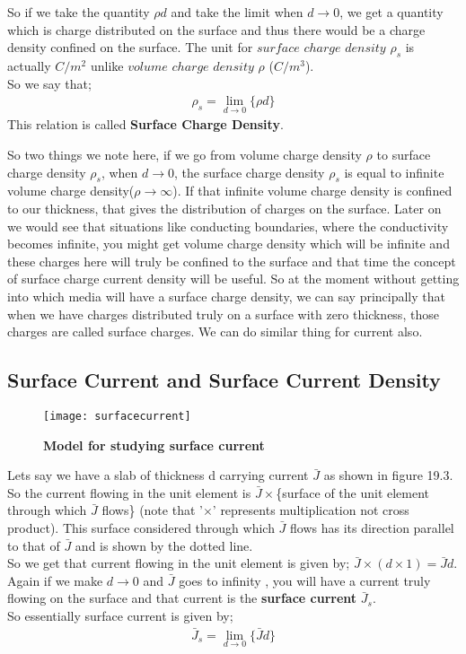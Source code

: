  
 So if we take the quantity $\rho d$ and take the limit when $d\rightarrow0$, we get a quantity which is charge distributed on the surface and thus there would be a charge density confined on the surface. The unit for $surface$ $charge$ $density$ $\rho_{s}$ is actually $C/m^{2}$ unlike $volume$ $charge$ $density$ $\rho$ ($C/m^{3}$).\\
 So we say that;
 \begin{align}
 \rho_{s}=\lim_{d\rightarrow0}\{\rho d\} 
 \end{align}
 This relation is called \textbf{Surface Charge Density}.
 
 
 So two things we note here, if we go from volume charge density $\rho$ to surface charge density $\rho_{s}$, when $d\rightarrow0$, the surface charge density $\rho_{s}$ is equal to infinite volume charge density($\rho\rightarrow\infty$). If that infinite volume charge density is confined to our thickness, that gives the distribution of charges on the surface. Later on we would see that situations like conducting boundaries, where the conductivity becomes infinite, you might get volume charge density which will be infinite and these charges here will truly be confined to the surface and that time the concept of surface charge current density will be useful. So at the moment without getting into which media will have a surface charge density, we can say principally that when we have charges distributed truly on a surface with zero thickness, those charges are called surface charges. We can do similar thing for current also.
 
  \subsection{Surface Current and Surface Current Density}
  \begin{figure}[h]
 	\centering
 	\texttt{[image: surfacecurrent]}
 	\caption{\textbf{Model for studying surface current}}
 \end{figure} 


 Lets say we have a slab of thickness d carrying current $\bar{J}$ as shown in figure 19.3. So the current flowing in the unit element is $\bar{J}\times$\{surface of the unit element through which $\bar{J}$ flows\} (note that '$\times$' represents multiplication not cross product).
 This surface considered through which $\bar{J}$ flows has its direction parallel to that of $\bar{J}$ and is shown by the dotted line.\\ 
 So we get that current flowing in the unit element is given by; $\bar{J}\times(d\times1)=\bar{J}d$. Again if we make $d\rightarrow0$ and $\bar{J}$ goes to infinity , you will have a current truly flowing on the surface and that current is the \textbf{surface current} $\bar{J}_{s}$. \\
 So essentially surface current is given by;
 \begin{align}
 \bar{J}_{s}=\lim_{d\rightarrow0}\{\bar{J}d\}
 \end{align}
 
